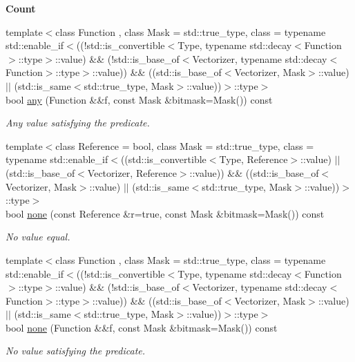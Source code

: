 \begin{Indent}{\bf Count}
\begin{DoxyCompactItemize}
{\footnotesize template$<$class Function , class Mask  = std\-::true\-\_\-type, class  = typename std\-::enable\-\_\-if$<$((!std\-::is\-\_\-convertible$<$\-Type, typename std\-::decay$<$\-Function$>$\-::type$>$\-::value) \&\& (!std\-::is\-\_\-base\-\_\-of$<$\-Vectorizer, typename std\-::decay$<$\-Function$>$\-::type$>$\-::value)) \&\& ((std\-::is\-\_\-base\-\_\-of$<$\-Vectorizer, Mask$>$\-::value) $|$$|$ (std\-::is\-\_\-same$<$std\-::true\-\_\-type, Mask$>$\-::value))$>$\-::type$>$ }\\bool \hyperlink{classmagrathea_1_1StaticVectorizer_a7d11dea2ad7e727d05ba44fe3c507d65}{any} (Function \&\&f, const Mask \&bitmask=Mask()) const 
\begin{DoxyCompactList}\small\item\em Any value satisfying the predicate. \end{DoxyCompactList}\item 
{\footnotesize template$<$class Reference  = bool, class Mask  = std\-::true\-\_\-type, class  = typename std\-::enable\-\_\-if$<$((std\-::is\-\_\-convertible$<$\-Type, Reference$>$\-::value) $|$$|$ (std\-::is\-\_\-base\-\_\-of$<$\-Vectorizer, Reference$>$\-::value)) \&\& ((std\-::is\-\_\-base\-\_\-of$<$\-Vectorizer, Mask$>$\-::value) $|$$|$ (std\-::is\-\_\-same$<$std\-::true\-\_\-type, Mask$>$\-::value))$>$\-::type$>$ }\\bool \hyperlink{classmagrathea_1_1StaticVectorizer_a69d72ba1d3a6d7cdaf384d0bad8eba11}{none} (const Reference \&r=true, const Mask \&bitmask=Mask()) const 
\begin{DoxyCompactList}\small\item\em No value equal. \end{DoxyCompactList}\item 
{\footnotesize template$<$class Function , class Mask  = std\-::true\-\_\-type, class  = typename std\-::enable\-\_\-if$<$((!std\-::is\-\_\-convertible$<$\-Type, typename std\-::decay$<$\-Function$>$\-::type$>$\-::value) \&\& (!std\-::is\-\_\-base\-\_\-of$<$\-Vectorizer, typename std\-::decay$<$\-Function$>$\-::type$>$\-::value)) \&\& ((std\-::is\-\_\-base\-\_\-of$<$\-Vectorizer, Mask$>$\-::value) $|$$|$ (std\-::is\-\_\-same$<$std\-::true\-\_\-type, Mask$>$\-::value))$>$\-::type$>$ }\\bool \hyperlink{classmagrathea_1_1StaticVectorizer_a8f67d8c8a6733e73b5f26b3c3345173c}{none} (Function \&\&f, const Mask \&bitmask=Mask()) const 
\begin{DoxyCompactList}\small\item\em No value satisfying the predicate. \end{DoxyCompactList}\end{DoxyCompactItemize}
\end{Indent}
